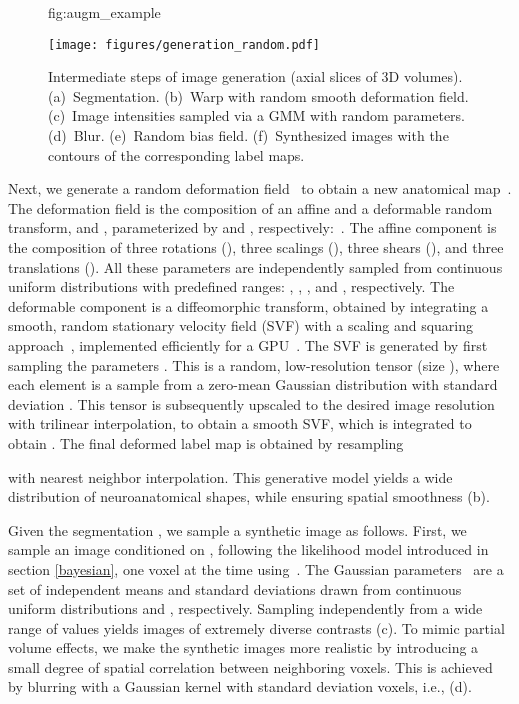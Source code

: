 \documentclass{midl}
\begin{document}
\begin{figure}[t]
\centering
\floatconts
  {fig:augm_example}
  {
  \caption{Intermediate steps of image generation (axial slices of 3D volumes). (a)~Segmentation. (b)~Warp with random smooth deformation field. (c)~Image intensities sampled via a GMM with random parameters. (d)~Blur. (e)~Random  bias field. (f)~Synthesized images with the contours of the corresponding label maps.}}
  {\texttt{[image: figures/generation\_random.pdf]}}
\end{figure}

Next, we generate a random deformation field~ to obtain a new anatomical map~\mbox{}. The deformation field  is the composition of an affine and a deformable random transform,  and , parameterized by  and , respectively:~. The affine component is the composition of three rotations (), three scalings (), three shears (), and three translations (). All these parameters are independently sampled from 
continuous uniform distributions with predefined ranges: , 
,
, 
and , respectively.
The deformable component is a diffeomorphic transform, obtained by integrating a smooth, random stationary velocity field (SVF) with a scaling and squaring approach~\cite{moler_nineteen_2003,arsigny_log-euclidean_2006}, implemented efficiently for a GPU~\cite{dalca_unsupervised_2019-1,krebs_learning_2019}. The SVF is generated by first sampling the parameters . This is a random, low-resolution tensor (size ), where each element is a sample from a zero-mean Gaussian distribution with standard deviation . This tensor is subsequently upscaled to the desired image resolution with trilinear interpolation, to obtain a smooth SVF, which is  integrated to obtain . The final deformed label map is obtained by resampling

with nearest neighbor interpolation. This generative model yields a wide distribution of neuroanatomical shapes, while ensuring spatial smoothness (b).

Given the segmentation , we sample a synthetic image  as follows. First, we sample an image  conditioned on , following the likelihood model introduced in section \ref{bayesian}, one voxel at the time using~. The Gaussian parameters~ are a set of  independent means and standard deviations drawn from continuous uniform distributions  and , respectively. Sampling independently from a wide range of values yields images of extremely diverse contrasts (c). To mimic  partial volume effects, we make the synthetic images more realistic by introducing a small degree of spatial correlation between neighboring voxels. This is achieved by blurring  with a Gaussian kernel  with standard deviation  voxels, i.e.,  (d).
\end{document}
